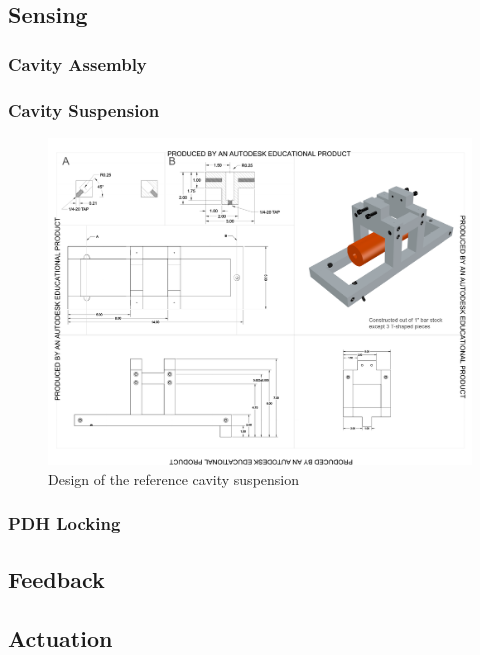 \subsection{Sensing}
\subsubsection{Cavity Assembly}
\subsubsection{Cavity Suspension}
\begin{figure}[htbp]
	\centering
		\includegraphics[width=15cm]{./figures/refcavsusdesign.pdf}
	\caption[Reference Cavity Suspension Design]{Design of the reference cavity suspension}
	\label{fig:refcav_sus}
\end{figure}

\subsubsection{PDH Locking}

\subsection{Feedback}

\subsection{Actuation}


